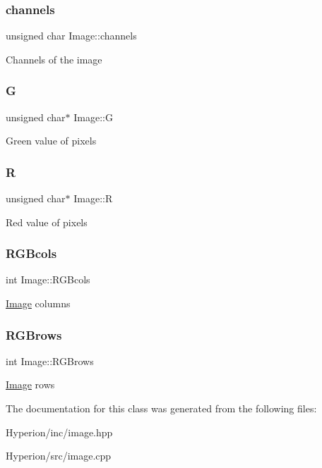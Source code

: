 \subsubsection{\texorpdfstring{channels}{channels}}
{\footnotesize\ttfamily unsigned char Image\+::channels}

Channels of the image \mbox{\label{classImage_a6678f22311b545bb530a9138d3639bdd}} 
\subsubsection{\texorpdfstring{G}{G}}
{\footnotesize\ttfamily unsigned char$\ast$ Image\+::G}

Green value of pixels \mbox{\label{classImage_a7792d25cb1b88da78b52994d25e66c50}} 
\subsubsection{\texorpdfstring{R}{R}}
{\footnotesize\ttfamily unsigned char$\ast$ Image\+::R}

Red value of pixels \mbox{\label{classImage_a83e180c07c91e9bc194e52f962a3edd3}} 
\subsubsection{\texorpdfstring{R\+G\+Bcols}{RGBcols}}
{\footnotesize\ttfamily int Image\+::\+R\+G\+Bcols}

\mbox{\hyperlink{classImage}{Image}} columns \mbox{\label{classImage_a889c1999ea31650f1337ba4c349a9d69}} 
\subsubsection{\texorpdfstring{R\+G\+Brows}{RGBrows}}
{\footnotesize\ttfamily int Image\+::\+R\+G\+Brows}

\mbox{\hyperlink{classImage}{Image}} rows 

The documentation for this class was generated from the following files\+:\begin{DoxyCompactItemize}
\item 
Hyperion/inc/image.\+hpp\item 
Hyperion/src/image.\+cpp\end{DoxyCompactItemize}
